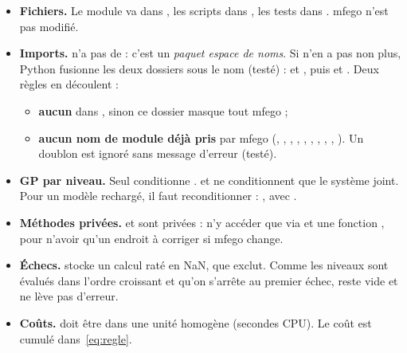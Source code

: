\documentclass[10pt,a4paper]{article}
\theoremstyle{plain}
\begin{document}
\begin{danslecode}
\begin{itemize}
  \item \textbf{Fichiers.} Le module va dans , les scripts
        dans , les tests dans . mfego n'est pas
        modifié.
  \item \textbf{Imports.}  n'a pas de  : c'est un \emph{paquet espace de
        noms}. Si  n'en a pas non plus, Python fusionne les deux dossiers sous le
        nom  (testé) :
         et , puis
         et .
        Deux règles en découlent :
        \begin{itemize}
          \item \textbf{aucun}  dans , sinon ce dossier masque
                tout mfego ;
          \item \textbf{aucun nom de module déjà pris} par mfego (, ,
                , , , , ,
                , , ). Un doublon est ignoré sans
                message d'erreur (testé).
        \end{itemize}
  \item \textbf{GP par niveau.} Seul  conditionne .  et
         ne conditionnent que le système joint. Pour un modèle rechargé, il faut
        reconditionner : , avec
        .
  \item \textbf{Méthodes privées.}  et  sont privées : n'y accéder que via
         et une fonction , pour n'avoir qu'un endroit à corriger si mfego
        change.
  \item \textbf{Échecs.}  stocke un calcul raté en NaN, que 
        exclut. Comme les niveaux sont évalués dans l'ordre croissant et qu'on s'arrête au premier échec,
         reste vide et  ne lève pas d'erreur.
  \item \textbf{Coûts.}  doit être dans une unité homogène (secondes CPU). Le coût est
        cumulé dans~\eqref{eq:regle}.
\end{itemize}
\end{danslecode}
\end{document}
